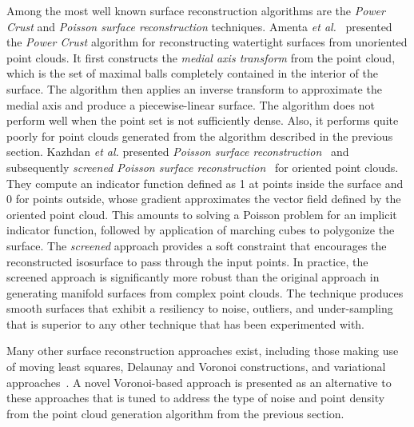 Among the most well known surface reconstruction algorithms are the \textit{Power Crust} and \textit{Poisson surface reconstruction} techniques. Amenta \textit{et al.}~\cite{amenta_2001} presented the \textit{Power Crust} algorithm for reconstructing watertight surfaces from unoriented point clouds. It first constructs the \textit{medial axis transform} from the point cloud, which is the set of maximal balls completely contained in the interior of the surface. The algorithm then applies an inverse transform to approximate the medial axis and produce a piecewise-linear surface. The algorithm does not perform well when the point set is not sufficiently dense. Also, it performs quite poorly for point clouds generated from the algorithm described in the previous section. Kazhdan \textit{et al.} presented \textit{Poisson surface reconstruction}~\cite{kazhdan_2008} and subsequently \textit{screened Poisson surface reconstruction}~\cite{kazhdan_2013} for oriented point clouds. They compute an indicator function defined as 1 at points inside the surface and 0 for points outside, whose gradient approximates the vector field defined by the oriented point cloud. This amounts to solving a Poisson problem for an implicit indicator function, followed by application of marching cubes to polygonize the surface. The \textit{screened} approach provides a soft constraint that encourages the reconstructed isosurface to pass through the input points. In practice, the screened approach is significantly more robust than the original approach in generating manifold surfaces from complex point clouds. The technique produces smooth surfaces that exhibit a resiliency to noise, outliers, and under-sampling that is superior to any other technique that has been experimented with.

Many other surface reconstruction approaches exist, including those making use of moving least squares, Delaunay and Voronoi constructions, and variational approaches~\cite{berger}. A novel Voronoi-based approach is presented as an alternative to these approaches that is tuned to address the type of noise and point density from the point cloud generation algorithm from the previous section.

